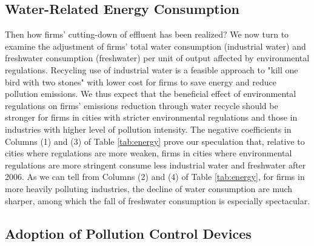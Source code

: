 \documentclass[12pt,english]{article}
\begin{document}
	

\subsection{Water-Related Energy Consumption}\label{sec:energy}

Then how firms' cutting-down of effluent has been realized? We now turn to examine the adjustment of firms' total water consumption (industrial water) and freshwater consumption (freshwater) per unit of output affected by environmental regulations. Recycling use of industrial water is a feasible approach to "kill one bird with two stones" with lower cost for firms to save energy and reduce pollution emissions. We thus expect that the beneficial effect of environmental regulations on firms' emissions reduction through water recycle should be stronger for firms in cities with stricter environmental regulations and those in industries with higher level of pollution intensity. The negative coefficients in Columns (1) and (3) of Table \ref{tab:energy} prove our speculation that, relative to cities where regulations are more weaken, firms in cities where environmental regulations are more stringent consume less industrial water and freshwater after 2006. As we can tell from Columns (2) and (4) of Table \ref{tab:energy}, for firms in more heavily polluting industries, the decline of water consumption are much sharper, among which the fall of freshwater consumption is especially spectacular.

 

\subsection{Adoption of Pollution Control Devices}\label{sec:facilities}
\end{document}
